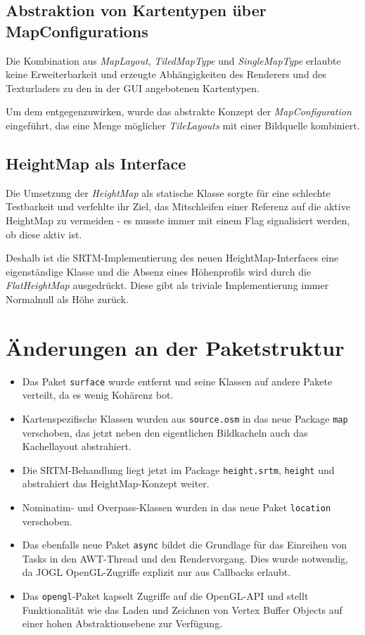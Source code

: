 \documentclass[10pt]{scrreprt}
\begin{document}
\subsection*{Abstraktion von Kartentypen über MapConfigurations}
Die Kombination aus \textit{MapLayout}, \textit{TiledMapType} und \textit{SingleMapType} erlaubte keine Erweiterbarkeit und erzeugte Abhängigkeiten des Renderers und des Texturladers zu den in der GUI angebotenen Kartentypen.

Um dem entgegenzuwirken, wurde das abstrakte Konzept der \textit{MapConfiguration} eingeführt, das eine Menge möglicher \textit{TileLayouts} mit einer Bildquelle kombiniert.

\subsection*{HeightMap als Interface}
Die Umsetzung der \textit{HeightMap} als statische Klasse sorgte für eine schlechte Testbarkeit und verfehlte ihr Ziel, das Mitschleifen einer Referenz auf die aktive HeightMap zu vermeiden - es musste immer mit einem Flag signalisiert werden, ob diese aktiv ist.

Deshalb ist die SRTM-Implementierung des neuen HeightMap-Interfaces eine eigenständige Klasse und die Absenz eines Höhenprofils wird durch die \textit{FlatHeightMap} ausgedrückt. Diese gibt als triviale Implementierung immer Normalnull als Höhe zurück.
\pagebreak
\section{Änderungen an der Paketstruktur}
\begin{itemize}
\item Das Paket \texttt{surface} wurde entfernt und seine Klassen auf andere Pakete verteilt, da es wenig Kohärenz bot. 
\item Kartenspezifische Klassen wurden aus \texttt{source.osm} in das neue Package \texttt{map} verschoben, das jetzt neben den eigentlichen Bildkacheln auch das Kachellayout abstrahiert.
\item Die SRTM-Behandlung liegt jetzt im Package \texttt{height.srtm}, \texttt{height} und abstrahiert das HeightMap-Konzept weiter.
\item Nominatim- und Overpass-Klassen wurden in das neue Paket \texttt{location} verschoben.
\item Das ebenfalls neue Paket \texttt{async} bildet die Grundlage für das Einreihen von Tasks in den AWT-Thread und den Rendervorgang. Dies wurde notwendig, da JOGL OpenGL-Zugriffe explizit nur aus Callbacks erlaubt.
\item Das \texttt{opengl}-Paket kapselt Zugriffe auf die OpenGL-API und stellt Funktionalität wie das Laden und Zeichnen von Vertex Buffer Objects auf einer hohen Abstraktionsebene zur Verfügung.
\end{itemize}
\end{document}
